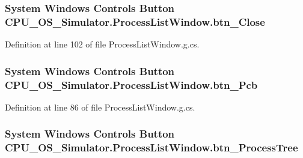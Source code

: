 \subsubsection[{btn\+\_\+\+Close}]{\setlength{\rightskip}{0pt plus 5cm}System Windows Controls Button C\+P\+U\+\_\+\+O\+S\+\_\+\+Simulator.\+Process\+List\+Window.\+btn\+\_\+\+Close\hspace{0.3cm}{\ttfamily [package]}}\label{class_c_p_u___o_s___simulator_1_1_process_list_window_ac1177a26dd05a2ffee666255abf6d6a1}


Definition at line 102 of file Process\+List\+Window.\+g.\+cs.

\hypertarget{class_c_p_u___o_s___simulator_1_1_process_list_window_a864b71efd3458da69accb656034e3072}{}
\subsubsection[{btn\+\_\+\+Pcb}]{\setlength{\rightskip}{0pt plus 5cm}System Windows Controls Button C\+P\+U\+\_\+\+O\+S\+\_\+\+Simulator.\+Process\+List\+Window.\+btn\+\_\+\+Pcb\hspace{0.3cm}{\ttfamily [package]}}\label{class_c_p_u___o_s___simulator_1_1_process_list_window_a864b71efd3458da69accb656034e3072}


Definition at line 86 of file Process\+List\+Window.\+g.\+cs.

\hypertarget{class_c_p_u___o_s___simulator_1_1_process_list_window_a425c0a45111e925325c81da79602ecb5}{}
\subsubsection[{btn\+\_\+\+Process\+Tree}]{\setlength{\rightskip}{0pt plus 5cm}System Windows Controls Button C\+P\+U\+\_\+\+O\+S\+\_\+\+Simulator.\+Process\+List\+Window.\+btn\+\_\+\+Process\+Tree\hspace{0.3cm}{\ttfamily [package]}}\label{class_c_p_u___o_s___simulator_1_1_process_list_window_a425c0a45111e925325c81da79602ecb5}


